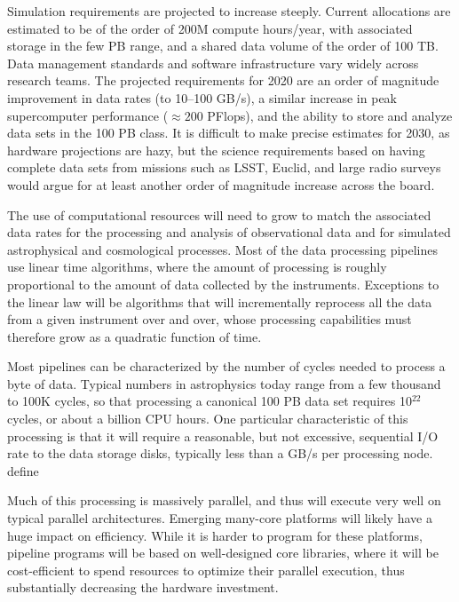 Simulation requirements are projected to increase steeply. Current
allocations are estimated to be of the order of 200M compute
hours/year, with associated storage in the few PB range, and a shared
data volume of the order of 100 TB. Data management standards and
software infrastructure vary widely across research teams. The
projected requirements for 2020 are an order of magnitude improvement
in data rates (to 10--100 GB/s), a similar increase in peak
supercomputer performance ($\approx 200$ PFlops), and the ability to store and
analyze data sets in the 100 PB class. It is difficult to make precise
estimates for 2030, as hardware projections are hazy, but the
science requirements based on having complete data sets from missions
such as LSST, Euclid, and large radio surveys would argue for at least
another order of magnitude increase across the board.


The use of computational resources will need to grow to match the
associated data rates for the processing and analysis of observational
data and for simulated astrophysical and cosmological processes. Most
of the data processing pipelines use linear time
algorithms, where the amount of processing is roughly proportional to
the amount of data collected by the instruments. Exceptions to the
linear law will be algorithms that will incrementally reprocess all
the data from a given instrument over and over, whose processing
capabilities must therefore grow as a quadratic function of time.

Most pipelines can be characterized by the number of cycles needed to
process a byte of data. Typical numbers in astrophysics today range
from a few thousand to 100K cycles, so that processing a canonical 100 PB
data set requires 10$^{22}$ cycles, or about a billion CPU hours.
One particular characteristic of this processing is that it
will require a reasonable, but not excessive, sequential I/O rate to
the data storage disks, typically less than a GB/s per
processing node. {\color{red} define}

Much of this processing is massively parallel, and thus will execute
very well on typical parallel architectures. Emerging many-core platforms will
likely have a huge impact on efficiency.
While it is harder to program for these platforms, pipeline
programs will be based on well-designed core libraries, where it will
be cost-efficient to spend resources to optimize their parallel
execution, thus substantially decreasing the hardware investment.


